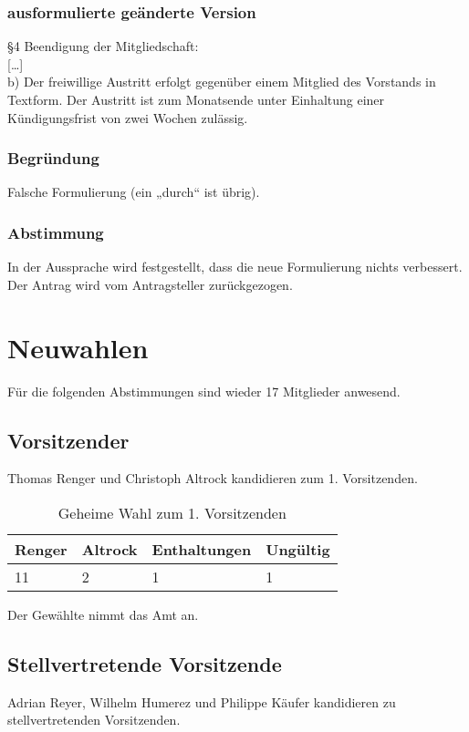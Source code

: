 \documentclass[a4paper]{scrartcl}
\begin{document}
\subsubsection{ausformulierte geänderte Version}

§4 Beendigung der Mitgliedschaft:\\
{[}\dots{]}\\
b) Der freiwillige Austritt erfolgt gegenüber einem Mitglied des Vorstands in Textform. Der Austritt ist zum Monatsende unter Einhaltung einer Kündigungsfrist von zwei Wochen zulässig.

\subsubsection{Begründung}

Falsche Formulierung (ein „durch“ ist übrig).

\subsubsection{Abstimmung}

In der Aussprache wird festgestellt, dass die neue Formulierung nichts verbessert. Der Antrag wird vom Antragsteller zurückgezogen.

\clearpage
\section{Neuwahlen}

Für die folgenden Abstimmungen sind wieder 17 Mitglieder anwesend.

\subsection{Vorsitzender}
Thomas Renger und Christoph Altrock kandidieren zum 1. Vorsitzenden.

\begin{table}[h]
	\begin{tabularx}{\textwidth}{XXXX}
		Renger & Altrock & Enthaltungen & Ungültig\\
		\toprule
		11 & 2 & 1 & 1\\
	\end{tabularx}
	\caption{Geheime Wahl zum 1. Vorsitzenden}
\end{table}
Der Gewählte nimmt das Amt an.

\subsection{Stellvertretende Vorsitzende}
Adrian Reyer, Wilhelm Humerez und Philippe Käufer kandidieren zu stellvertretenden Vorsitzenden.
\end{document}
